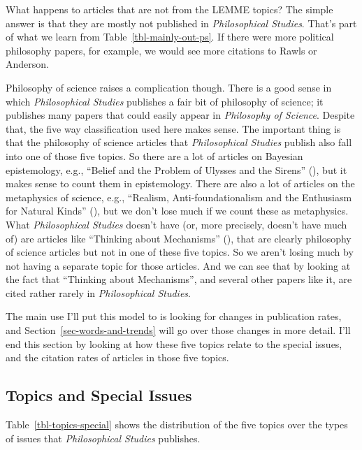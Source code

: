 \documentclass[
  10pt,
  letterpaper,
  DIV=11,
  numbers=noendperiod,
  twoside]{scrartcl}
\begin{document}
What happens to articles that are not from the LEMME topics? The simple
answer is that they are mostly not published in \emph{Philosophical
Studies}. That's part of what we learn from
Table~\ref{tbl-mainly-out-ps}. If there were more political philosophy
papers, for example, we would see more citations to Rawls or Anderson.

Philosophy of science raises a complication though. There is a good
sense in which \emph{Philosophical Studies} publishes a fair bit of
philosophy of science; it publishes many papers that could easily appear
in \emph{Philosophy of Science}. Despite that, the five way
classification used here makes sense. The important thing is that the
philosophy of science articles that \emph{Philosophical Studies} publish
also fall into one of those five topics. So there are a lot of articles
on Bayesian epistemology, e.g., ``Belief and the Problem of Ulysses and
the Sirens'' (), but it
makes sense to count them in epistemology. There are also a lot of
articles on the metaphysics of science, e.g., ``Realism,
Anti-foundationalism and the Enthusiasm for Natural Kinds''
(), but we don't lose much
if we count these as metaphysics. What \emph{Philosophical Studies}
doesn't have (or, more precisely, doesn't have much of) are articles
like ``Thinking about Mechanisms''
(),
that are clearly philosophy of science articles but not in one of these
five topics. So we aren't losing much by not having a separate topic for
those articles. And we can see that by looking at the fact that
``Thinking about Mechanisms'', and several other papers like it, are
cited rather rarely in \emph{Philosophical Studies}.

The main use I'll put this model to is looking for changes in
publication rates, and Section~\ref{sec-words-and-trends} will go over
those changes in more detail. I'll end this section by looking at how
these five topics relate to the special issues, and the citation rates
of articles in those five topics.

\subsection{Topics and Special Issues}\label{topics-and-special-issues}

Table~\ref{tbl-topics-special} shows the distribution of the five topics
over the types of issues that \emph{Philosophical Studies} publishes.
\end{document}
